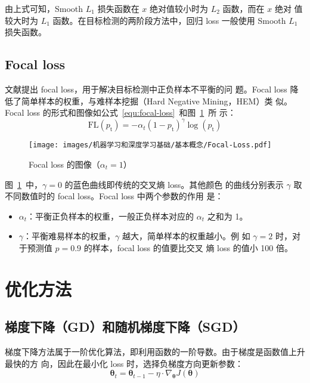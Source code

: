 由上式可知，Smooth $L_1$ 损失函数在 $x$ 绝对值较小时为 $L_2$ 函数，而在 $x$ 绝对
值较大时为 $L_1$ 函数。在目标检测的两阶段方法中，回归 loss 一般使用 Smooth $L_1$
损失函数。

\subsection{Focal loss}\label{subsec:focal}

文献提出 focal loss，用于解决目标检测中正负样本不平衡的问
题。Focal loss 降低了简单样本的权重，与难样本挖掘（Hard Negative Mining，HEM）类
似。Focal loss 的形式和图像如公式~\ref{equ:focal-loss}~和图~\ref{fig:focal-loss}~所
示：
\begin{equation}
  \label{equ:focal-loss}
  \mathrm{FL}(p_{\mathrm{t}}) = - \alpha_t {(1-p_{\mathrm{t}})}^{\gamma} \log (p_{\mathrm{t}})
\end{equation}

\begin{figure}[ht]
  \centering
  \texttt{[image: images/机器学习和深度学习基础/基本概念/Focal-Loss.pdf]}
  \caption{Focal loss 的图像（$\alpha_t = 1$）}\label{fig:focal-loss}
\end{figure}

图~\ref{fig:focal-loss}~中，$\gamma = 0$ 的蓝色曲线即传统的交叉熵 loss。其他颜色
的曲线分别表示 $\gamma$ 取不同数值时的 focal loss。Focal loss 中两个参数的作用
是：

\begin{itemize}
  \item $\alpha_t$：平衡正负样本的权重，一般正负样本对应的 $\alpha_t$ 之和为 1。
  \item $\gamma$：平衡难易样本的权重，$\gamma$ 越大，简单样本的权重越小。例
    如 $\gamma = 2$ 时，对于预测值 $p = 0.9$ 的样本，focal loss 的值要比交叉
    熵 loss 的值小 100 倍。
\end{itemize}

\section{优化方法}\label{sec:opt}

\subsection{梯度下降（GD）和随机梯度下降（SGD）}
梯度下降方法属于一阶优化算法，即利用函数的一阶导数。由于梯度是函数值上升最快的方
向，因此在最小化 loss 时，选择负梯度方向更新参数：
\begin{equation}
  \boldsymbol{\theta}_t = \boldsymbol{\theta}_{t-1} - \eta \cdot \nabla_{\boldsymbol{\theta}}J(\boldsymbol{\theta})
\end{equation}

